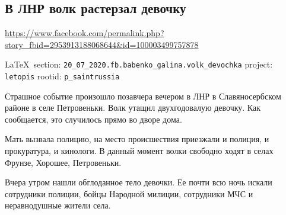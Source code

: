  
 

\subsection{В ЛНР волк растерзал девочку}
\label{sec:20_07_2020.fb.babenko_galina.volk_devochka}
\url{https://www.facebook.com/permalink.php?story_fbid=2953913188068644&id=100003499757878}
  
\vspace{0.5cm}
{\small\LaTeX~section: \verb|20_07_2020.fb.babenko_galina.volk_devochka| project: \verb|letopis| rootid: \verb|p_saintrussia|}
\vspace{0.5cm}

Страшное событие произошло позавчера вечером в ЛНР в Славяносербском районе в
селе Петровеньки. Волк утащил двухгодовалую девочку. Как сообщается, это
случилось прямо во дворе дома.

Мать вызвала полицию, на место происшествия приезжали и полиция, и прокуратура,
и кинологи. В данный момент волки свободно ходят в селах Фрунзе, Хорошее,
Петровеньки.

Вчера утром нашли обглоданное тело девочки. Ее почти всю ночь искали сотрудники
полиции, бойцы Народной милиции, сотрудники МЧС и неравнодушные жители села.
  
